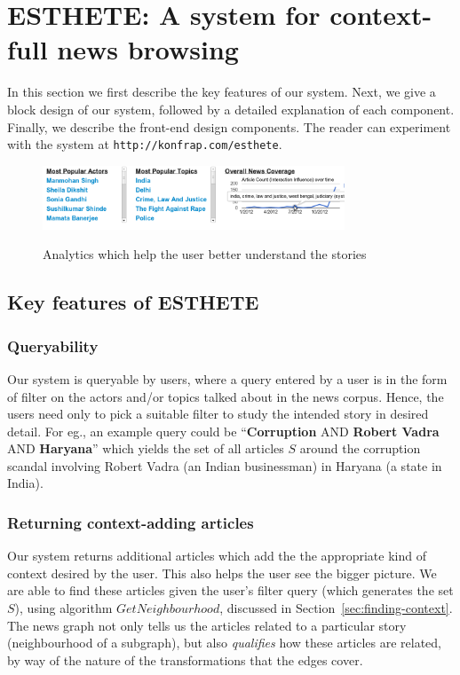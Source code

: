 \section{ESTHETE: A system for context-full news browsing }
\label{sec:block}

In this section we first describe the key features of our system. Next, we give a block design of our system, followed by a detailed explanation
of each component. Finally, we describe the front-end design components. The reader can experiment with the system at {\tt http://konfrap.com/esthete}.
\begin{figure}[ht]
\begin{center}
\caption{Analytics which help the user better understand the stories}
\includegraphics[width=9cm,scale=0.30]{figures/faceted2.png}
\label{fig:faceted-search}
\end{center}
\end{figure}

\subsection{Key features of ESTHETE}
\subsubsection{Queryability}
Our system is queryable by users, where a query entered by a user is in the form of filter on the actors and/or topics talked about in the
news corpus. Hence, the users need only to pick a suitable filter to study the intended story in desired detail. For eg., an example query could
be ``{\bf Corruption} AND {\bf Robert Vadra} AND {\bf Haryana}'' which yields the set of all articles $S$ around the corruption scandal involving Robert Vadra
(an Indian businessman) in Haryana (a state in India). 

\subsubsection{Returning context-adding articles}
Our system returns additional articles which add the the appropriate kind of context desired by the user. This also helps the user see the bigger picture. 
We are able to find these articles given the user's filter query (which generates the set $S$), using algorithm $GetNeighbourhood$, discussed in Section~\ref{sec:finding-context}. The news graph not only tells us the articles related to a particular story (neighbourhood of a subgraph), but also \emph{qualifies} how these articles are related, by way of the nature of the transformations that the edges cover. 

